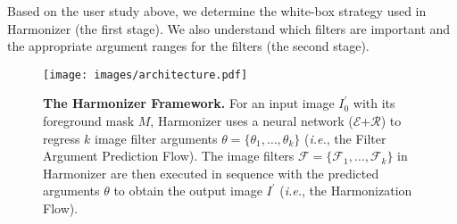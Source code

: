 \documentclass[runningheads]{llncs}
\begin{document}
Based on the user study above, we determine the white-box strategy used in Harmonizer (the first stage). We also understand which filters are important and the appropriate argument ranges for the filters (the second stage).

 \begin{figure}[t]
\centering
\texttt{[image: images/architecture.pdf]}
{\begin{center}
\vspace{-0.5cm}
\caption{\textbf{The Harmonizer Framework.} For an input image $I^{\prime}_{0}$ with its foreground mask $M$, Harmonizer uses a neural network ($\mathcal{E}$+$\mathcal{R}$) to regress $k$ image filter arguments $\theta=\{\theta_{1}, \dots, \theta_{k}\}$ (\textit{i.e.}, the Filter Argument Prediction Flow). The image filters $\mathcal{F}=\{\mathcal{F}_{1}, \dots, \mathcal{F}_k\}$ in Harmonizer are then executed in sequence with the predicted arguments $\theta$ to obtain the 
output image $I^{\prime}$ (\textit{i.e.}, the Harmonization Flow).}
\label{fig:architecture}
\end{center}
}
\vspace{-0.7cm}
\end{figure}
\end{document}

